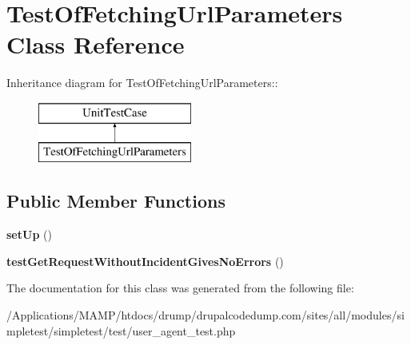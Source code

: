 \hypertarget{class_test_of_fetching_url_parameters}{
\section{TestOfFetchingUrlParameters Class Reference}
\label{class_test_of_fetching_url_parameters}
}
Inheritance diagram for TestOfFetchingUrlParameters::\begin{figure}[H]
\begin{center}
\leavevmode
\includegraphics[height=2cm]{class_test_of_fetching_url_parameters}
\end{center}
\end{figure}
\subsection*{Public Member Functions}
\begin{DoxyCompactItemize}
\item 
\hypertarget{class_test_of_fetching_url_parameters_a42d4903dabcdd5d8698f8e7170776c85}{
{\bfseries setUp} ()}
\label{class_test_of_fetching_url_parameters_a42d4903dabcdd5d8698f8e7170776c85}

\item 
\hypertarget{class_test_of_fetching_url_parameters_a39c8f6181144162465b560dbd573ace2}{
{\bfseries testGetRequestWithoutIncidentGivesNoErrors} ()}
\label{class_test_of_fetching_url_parameters_a39c8f6181144162465b560dbd573ace2}

\end{DoxyCompactItemize}


The documentation for this class was generated from the following file:\begin{DoxyCompactItemize}
\item 
/Applications/MAMP/htdocs/drump/drupalcodedump.com/sites/all/modules/simpletest/simpletest/test/user\_\-agent\_\-test.php\end{DoxyCompactItemize}
